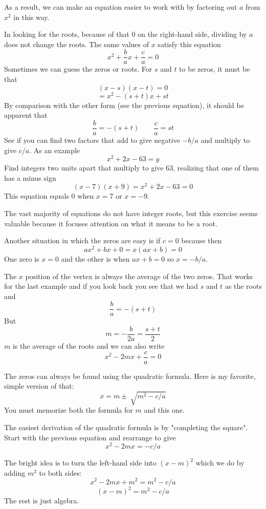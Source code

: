 \documentclass[11pt, oneside]{article}
\begin{document}
As a result, we can make an equation easier to work with by factoring out $a$ from $x^2$ in this way.

In looking for the roots, because of that $0$ on the right-hand side, dividing by $a$ does not change the roots.  The same values of $x$ satisfy this equation
\[ x^2 + \frac{b}{a} x + \frac{c}{a} =  0 \]
Sometimes we can guess the zeros or roots.  For $s$ and $t$ to be zeros, it must be that
\[ (x - s)(x - t) = 0 \]
\[ = x^2 - (s + t)x + st  \]
By comparison with the other form (see the previous equation), it should be apparent that
\[ \frac{b}{a} = - (s + t) \ \ \ \ \ \ \ \ \  \frac{c}{a} = st \]
See if you can find two factors that add to give negative $-b/a$ and multiply to give $c/a$.  As an example
\[ x^2 + 2x - 63 = y \]
Find integers two units apart that multiply to give $63$, realizing that one of them has a minus sign
\[ (x - 7)(x + 9) = x^2 + 2x - 63 = 0 \]
This equation equals $0$ when $x = 7$ or $x = -9$.

The vast majority of equations do not have integer roots, but this exercise seems valuable because it focuses attention on what it means to be a root.

Another situation in which the zeros are easy is if $c = 0$ because then
\[ ax^2 + bx + 0 = x(ax + b) = 0 \]
One zero is $x=0$ and the other is when $ax+b = 0$ so $x = -b/a$.  

The $x$ position of the vertex is always the average of the two zeros.  That works for the last example and if you look back you see that we had $s$ and $t$ as the roots and
\[ \frac{b}{a} = - (s + t) \]
But
\[ m = - \frac{b}{2a} = \frac{s + t}{2} \]
$m$ is the average of the roots and we can also write
\[ x^2 - 2mx + \frac{c}{a} =  0 \]

The zeros can always be found using the quadratic formula.  Here is my favorite, simple version of that:
\[ x = m \pm \ \sqrt{m^2 - c/a} \]
You must memorize both the formula for $m$ and this one.  

The easiest derivation of the quadratic formula is by "completing the square".  Start with the previous equation and rearrange to give
\[ x^2 - 2mx  =  - c/a  \]

The bright idea is to turn the left-hand side into $(x - m)^2$ which we do by adding $m^2$ to both sides:
\[ x^2 - 2mx + m^2 = m^2 - c/a  \]
\[ (x - m)^2 = m^2 - c/a  \]
The rest is just algebra.
\end{document}
